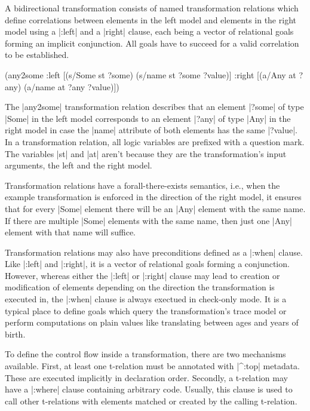 \documentclass[a4paper]{article}
\newcommand{\code}{\clojureinline}
\begin{document}
A bidirectional transformation consists of named transformation relations which
define correlations between elements in the left model and elements in the
right model using a \code|:left| and a \code|right| clause, each being a vector
of relational goals forming an implicit conjunction.  All goals have to succeed
for a valid correlation to be established.

\begin{clojurecode}
  (any2some
   :left  [(s/Some st ?some)
           (s/name st ?some ?value)]
   :right [(a/Any at ?any)
           (a/name at ?any ?value)])
\end{clojurecode}

The \code|any2some| transformation relation describes that an element
\code|?some| of type \code|Some| in the left model corresponds to an element
\code|?any| of type \code|Any| in the right model in case the \code|name|
attribute of both elements has the same \code|?value|.  In a transformation
relation, all logic variables are prefixed with a question mark.  The variables
\code|st| and \code|at| aren't because they are the transformation's input
arguments, the left and the right model.

Transformation relations have a forall-there-exists semantics, i.e., when the
example transformation is enforced in the direction of the right model, it
ensures that for every \code|Some| element there will be an \code|Any| element
with the same name.  If there are multiple \code|Some| elements with the same
name, then just one \code|Any| element with that name will suffice.

Transformation relations may also have preconditions defined as a \code|:when|
clause.  Like \code|:left| and \code|:right|, it is a vector of relational
goals forming a conjunction.  However, whereas either the \code|:left| or
\code|:right| clause may lead to creation or modification of elements depending
on the direction the transformation is executed in, the \code|:when| clause is
always exectued in check-only mode.  It is a typical place to define goals
which query the transformation's trace model or perform computations on plain
values like translating between ages and years of birth.

To define the control flow inside a transformation, there are two mechanisms
available.  First, at least one t-relation must be annotated with \code|^:top|
metadata.  These are executed implicitly in declaration order.  Secondly, a
t-relation may have a \code|:where| clause containing arbitrary code.  Usually,
this clause is used to call other t-relations with elements matched or created
by the calling t-relation.
\end{document}
